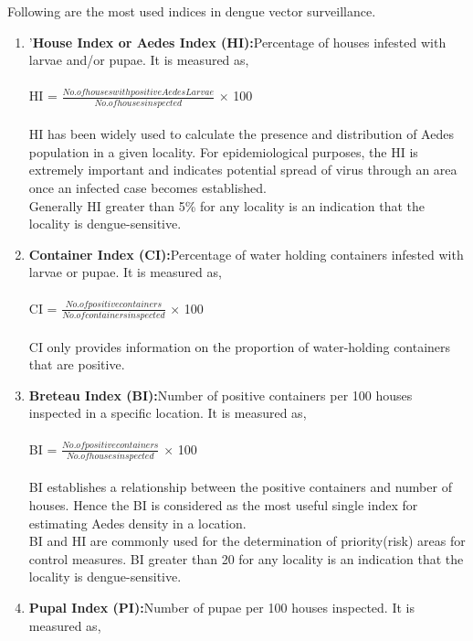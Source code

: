 \documentclass[11pt]{exam}
\begin{document}
\begin{questions}
\begin{enumerate}
Following are the most used indices in dengue vector surveillance.
\begin{enumerate}
\item '\textbf{House Index or Aedes Index (HI):}Percentage of houses infested with larvae and/or pupae. It is measured as, \\ \\
      HI = $\frac{No. of houses with positive Aedes Larvae}{No. of houses inspected}$ $\times$ 100 \\ \\
      HI has been widely used to calculate the presence and distribution of Aedes population in a given locality. For epidemiological purposes, the HI is extremely important and indicates potential spread of virus through an area once an infected case becomes established.\\
      Generally HI greater than 5\% for any locality is an indication that the locality is dengue-sensitive. \\
\item \textbf{Container Index (CI):}Percentage of water holding containers infested with larvae or pupae. It is measured as, \\ \\
      CI = $\frac{No. of positive containers}{No. of containers inspected}$ $\times$ 100 \\ \\
      CI only provides information on the proportion of water-holding containers that are positive.\\
\item \textbf{Breteau Index (BI):}Number of positive containers per 100 houses inspected in a specific location. It is measured as, \\ \\
      BI = $\frac{No. of positive containers}{No. of houses inspected}$ $\times$ 100 \\ \\
      BI establishes a relationship between the positive containers and number of houses. Hence the BI is considered as the most useful single index for estimating Aedes density in a location. \\
      BI and HI are commonly used for the determination of priority(risk) areas for control measures. BI greater than 20 for any locality is an indication that the locality is dengue-sensitive.\\
\item \textbf{Pupal Index (PI):}Number of pupae per 100 houses inspected. It is measured as, \\ \\

\end{enumerate}
\end{enumerate}
\end{questions}
\end{document}
